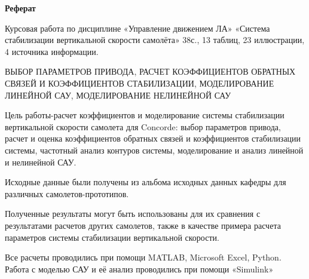 \newpage
\begin{center}
    \textbf{Реферат}
\end{center}

Курсовая работа по дисциплине «Управление движением ЛА» «Система стабилизации вертикальной скорости самолёта» 38с., 13 таблиц, 23 иллюстрации, 4 источника информации.

ВЫБОР ПАРАМЕТРОВ ПРИВОДА, РАСЧЕТ КОЭФФИЦИЕНТОВ ОБРАТНЫХ СВЯЗЕЙ И КОЭФФИЦИЕНТОВ СТАБИЛИЗАЦИИ, МОДЕЛИРОВАНИЕ ЛИНЕЙНОЙ САУ, МОДЕЛИРОВАНИЕ НЕЛИНЕЙНОЙ САУ

Цель работы-расчет коэффициентов и моделирование системы стабилизации вертикальной скорости самолета для Concorde: выбор параметров привода, расчет и оценка коэффициентов обратных связей и коэффициентов стабилизации системы, частотный анализ контуров системы, моделирование и анализ линейной и нелинейной САУ. 

Исходные данные были получены из альбома исходных данных кафедры для различных самолетов-прототипов. 

Полученные результаты могут быть использованы для их сравнения с результатами расчетов других самолетов, также в качестве примера расчета параметров системы стабилизации вертикальной скорости.

Все расчеты проводились при помощи MATLAB, Microsoft Excel, Python.
Работа с моделью САУ и её анализ проводились при помощи «Simulink»
